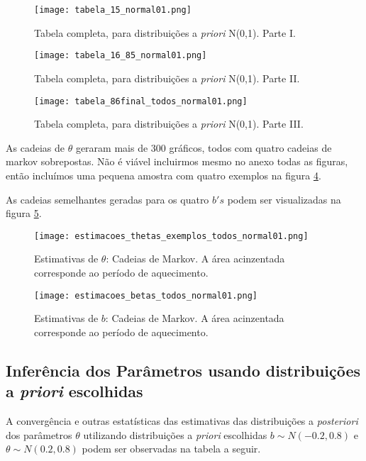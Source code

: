 \documentclass[
	12pt,				%
	openright,			%
	twoside,			%
	a4paper,			%
	english,			%
	brazil				%
	]{abntex2}
\begin{document}
\begin{anexosenv}
 \begin{figure}[!htbp]
    \centering
    \texttt{[image: tabela\_15\_normal01.png]}
    \caption{Tabela completa, para distribuições a \textit{priori} N(0,1). Parte I.}
    \label{fig:tabelacompleta01}
 \end{figure}
 
 \begin{figure}[!htbp]
    \centering
    \texttt{[image: tabela\_16\_85\_normal01.png]}
    \caption{Tabela completa, para distribuições a \textit{priori} N(0,1). Parte II.}
    \label{fig:tabelacompleta02}
 \end{figure}
 
 \begin{figure}[!htbp]
    \centering
    \texttt{[image: tabela\_86final\_todos\_normal01.png]}
    \caption{Tabela completa, para distribuições a \textit{priori} N(0,1). Parte III.}
    \label{fig:tabelacompleta03}
 \end{figure}
 
 \newpage
 
 As cadeias de $\theta$ geraram mais de 300 gráficos, todos com quatro cadeias de markov sobrepostas. Não é viável incluirmos mesmo no anexo todas as figuras, então incluímos uma pequena amostra com quatro exemplos na figura \ref{fig:thetasquatro01}.
 
 As cadeias semelhantes geradas para os quatro $b's$ podem ser visualizadas na figura \ref{fig:betasquatro01}.
 
 \begin{figure}[!htbp]
    \centering
    \texttt{[image: estimacoes\_thetas\_exemplos\_todos\_normal01.png]}
    \caption{Estimativas de $\theta$: Cadeias de Markov. A área acinzentada corresponde ao período de aquecimento.}
    \label{fig:thetasquatro01}
 \end{figure}
 
 \begin{figure}[!htbp]
    \centering
    \texttt{[image: estimacoes\_betas\_todos\_normal01.png]}
    \caption{Estimativas de $b$: Cadeias de Markov. A área acinzentada corresponde ao período de aquecimento.}
    \label{fig:betasquatro01}
 \end{figure}
 
 \newpage
 
 \subsection{Inferência dos Parâmetros usando distribuições a \emph{priori} escolhidas}\label{extraescolhida}
 A convergência e outras estatísticas das estimativas das distribuições a \textit{posteriori} dos parâmetros $\theta$ utilizando distribuições a \textit{priori} escolhidas $b \sim N(-0.2, 0.8)$ e $\theta \sim N(0.2, 0.8)$ podem ser observadas na tabela a seguir.
 

\end{anexosenv}
\end{document}
